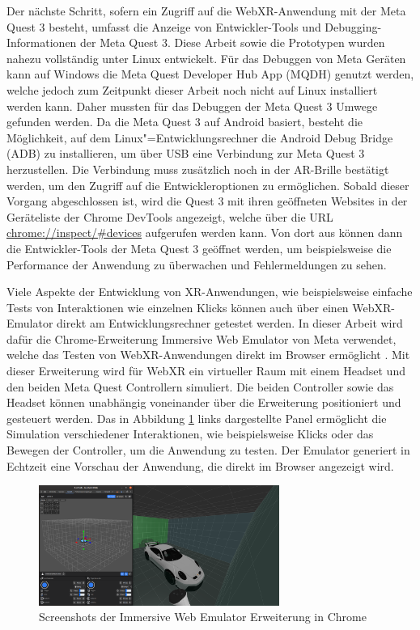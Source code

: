 Der nächste Schritt, sofern ein Zugriff auf die WebXR-Anwendung mit der Meta Quest 3 besteht, umfasst die Anzeige von Entwickler-Tools und Debugging-Informationen der Meta Quest 3.
Diese Arbeit sowie die Prototypen wurden nahezu vollständig unter Linux entwickelt.
Für das Debuggen von Meta Geräten kann auf Windows die Meta Quest Developer Hub App (MQDH) genutzt werden, welche jedoch zum Zeitpunkt dieser Arbeit noch nicht auf Linux installiert werden kann.
Daher mussten für das Debuggen der Meta Quest 3 Umwege gefunden werden. \newline
Da die Meta Quest 3 auf Android basiert, besteht die Möglichkeit, auf dem Linux"=Entwicklungsrechner die Android Debug Bridge (ADB) zu installieren, um über USB eine Verbindung zur Meta Quest 3 herzustellen.
Die Verbindung muss zusätzlich noch in der AR-Brille bestätigt werden, um den Zugriff auf die Entwickleroptionen zu ermöglichen.
Sobald dieser Vorgang abgeschlossen ist, wird die Quest 3 mit ihren geöffneten Websites in der Geräteliste der Chrome DevTools angezeigt, welche über die URL \url{chrome://inspect/#devices} aufgerufen werden kann.
Von dort aus können dann die Entwickler-Tools der Meta Quest 3 geöffnet werden, um beispielsweise die Performance der Anwendung zu überwachen und Fehlermeldungen zu sehen.

Viele Aspekte der Entwicklung von XR-Anwendungen, wie beispielsweise einfache Tests von Interaktionen wie einzelnen Klicks können auch über einen WebXR-Emulator direkt am Entwicklungsrechner getestet werden.
In dieser Arbeit wird dafür die Chrome-Erweiterung \glqq{}Immersive Web Emulator\grqq{} von Meta verwendet, welche das Testen von WebXR-Anwendungen direkt im Browser ermöglicht \autocite{immersive-web-emulator}.
Mit dieser Erweiterung wird für WebXR ein virtueller Raum mit einem Headset und den beiden Meta Quest Controllern simuliert.
Die beiden Controller sowie das Headset können unabhängig voneinander über die Erweiterung positioniert und gesteuert werden.
Das in Abbildung \ref{fig:webxr-emulator} links dargestellte Panel ermöglicht die Simulation verschiedener Interaktionen, wie beispielsweise Klicks oder das Bewegen der Controller, um die Anwendung zu testen.
Der Emulator generiert in Echtzeit eine Vorschau der Anwendung, die direkt im Browser angezeigt wird.

\begin{figure}[H]
    \centering
    \includegraphics[width=0.7\textwidth]{images/WebXR-Emulator.png}
    \caption{Screenshots der Immersive Web Emulator Erweiterung in Chrome}
    \label{fig:webxr-emulator}
\end{figure}

